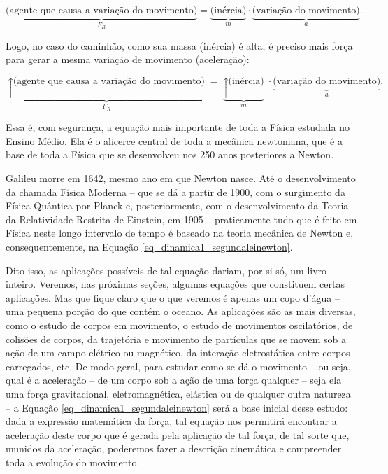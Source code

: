 $$  \underbrace{\text{(agente que causa a variação do movimento)}}_{\text{$F_R$}} = \underbrace{\text{(inércia)} }_{m} \cdot \underbrace{\text{(variação do movimento)}}_{a} .  $$




Logo, no caso do caminhão, como sua massa (inércia) é alta, é preciso mais força para gerar a mesma variação de movimento (aceleração):

$$  \underbrace{ \uparrow \text{(agente que causa a variação do movimento)}}_{\text{$F_R$}} = \underbrace{ \uparrow \text{(inércia)} }_{m} \cdot \underbrace{\text{(variação do movimento)}}_{a} .  $$






Essa é, com segurança, a equação mais importante de toda a Física estudada no Ensino Médio. Ela é o alicerce central de toda a mecânica newtoniana, que é a base de toda a Física que se desenvolveu nos 250 anos posteriores a Newton. 

Galileu morre em 1642, mesmo ano em que Newton nasce. Até o desenvolvimento da chamada Física Moderna – que se dá a partir de 1900, com o surgimento da Física Quântica por Planck e, posteriormente, com o desenvolvimento da Teoria da Relatividade Restrita de Einstein, em 1905 – praticamente tudo que é feito em Física neste longo intervalo de tempo é baseado na teoria mecânica de Newton e, consequentemente, na Equação \eqref{eq_dinamica1_segundaleinewton}.

Dito isso, as aplicações possíveis de tal equação dariam, por si só, um livro inteiro. Veremos, nas próximas seções, algumas equações que constituem certas aplicações. Mas que fique claro que o que veremos é apenas um copo d'água -- uma pequena porção do que contém o oceano. As aplicações são as mais diversas, como o estudo de corpos em movimento, o estudo de movimentos oscilatórios, de colisões de corpos, da trajetória e movimento de partículas que se movem sob a ação de um campo elétrico ou magnético, da interação eletrostática entre corpos carregados, etc. De modo geral, para estudar como se dá o movimento -- ou seja, qual é a aceleração -- de um corpo sob a ação de uma força qualquer -- seja ela uma força gravitacional, eletromagnética, elástica ou de qualquer outra natureza -- a Equação \eqref{eq_dinamica1_segundaleinewton} será a base inicial desse estudo: dada a expressão matemática da força, tal equação nos permitirá encontrar a aceleração deste corpo que é gerada pela aplicação de tal força, de tal sorte que, munidos da aceleração, poderemos fazer a descrição cinemática e compreender toda a evolução do movimento.


